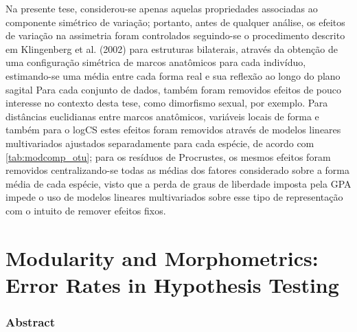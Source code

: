 \documentclass[12pt,twoside]{report}
\begin{document}
Na presente tese, considerou-se apenas aquelas propriedades associadas
ao componente simétrico de variação; portanto, antes de qualquer
análise, os efeitos de variação na assimetria foram controlados
seguindo-se o procedimento descrito em Klingenberg et al. (2002) para
estruturas bilaterais, através da obtenção de uma configuração simétrica
de marcos anatômicos para cada indivíduo, estimando-se uma média entre
cada forma real e sua reflexão ao longo do plano sagital Para cada
conjunto de dados, também foram removidos efeitos de pouco interesse no
contexto desta tese, como dimorfismo sexual, por exemplo. Para
distâncias euclidianas entre marcos anatômicos, variáveis locais de
forma e também para o logCS estes efeitos foram removidos através de
modelos lineares multivariados ajustados separadamente para cada
espécie, de acordo com \autoref{tab:modcomp_otu}; para os resíduos de
Procrustes, os mesmos efeitos foram removidos centralizando-se todas as
médias dos fatores considerado sobre a forma média de cada espécie,
visto que a perda de graus de liberdade imposta pela GPA impede o uso de
modelos lineares multivariados sobre esse tipo de representação com o
intuito de remover efeitos fixos.

\def\sectionautorefname{Section} \def\chapterautorefname{Chapter}
\def\figureautorefname{Figure} \def\tableautorefname{Table}


\newpage
\chapter{Modularity and Morphometrics: Error Rates in Hypothesis Testing}
\label{ch:modcomp}

\subsection{Abstract}\label{abstract}
\end{document}
